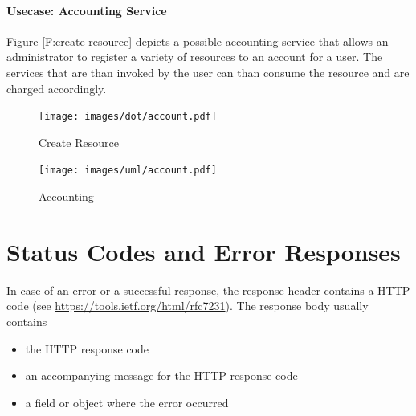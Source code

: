 \documentclass[10pt]{article}
\begin{document}


\paragraph{Usecase: Accounting Service}

Figure \ref{F:create resource} depicts a possible accounting service
that allows an administrator to register a variety of resources to an
account for a user. The services that are than invoked by the user can
than consume the resource and are charged accordingly.

\begin{figure}[!h]
\texttt{[image: images/dot/account.pdf]}
\caption{Create Resource}\label{F:createresource}
\end{figure}

\begin{figure}[!h]
\centering
\texttt{[image: images/uml/account.pdf]}
\caption{Accounting}\label{F:uml-accounting}
\end{figure}

%

\section{Status Codes and Error Responses}

In case of an error or a successful response, the response header
contains a HTTP code (see
\url{https://tools.ietf.org/html/rfc7231}). The response body usually
contains

\begin{itemize}
\item the HTTP response code
\item an accompanying message for the HTTP response code
\item a field or object where the error occurred 
\end{itemize}
\end{document}
